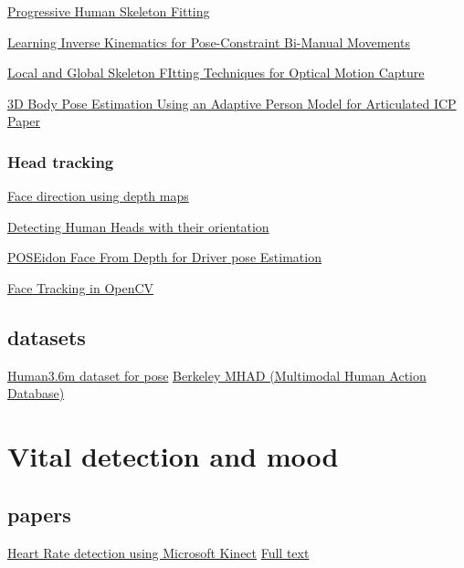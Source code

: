 \href{http://vision.gel.ulaval.ca/~vignolaj/vignolaVI03.pdf}{Progressive Human Skeleton Fitting}

\href{https://link.springer.com/content/pdf/10.1007/978-3-642-15193-4_45.pdf}{Learning Inverse Kinematics for Pose-Constraint Bi-Manual Movements}

\href{https://pdfs.semanticscholar.org/8492/075b6d9ed4a3065849d0b0eb7a705a5112b9.pdf}{Local and Global Skeleton FItting Techniques for Optical Motion Capture}

\href{https://link.springer.com/chapter/10.1007\%2F978-3-642-25489-5_16}{3D Body Pose Estimation Using an Adaptive Person Model for Articulated ICP}
\href{https://link.springer.com/content/pdf/10.1007\%2F978-3-642-25489-5_16.pdf}{Paper}

\subsubsection{Head tracking}
\href{https://arxiv.org/pdf/1309.3418.pdf}{Face direction using depth maps}

\href{http://www.dgcv.nii.ac.jp/Publications/Papers/2005/elcviaVol5No3-05.pdf}{Detecting Human Heads with their orientation}

\href{https://arxiv.org/abs/1611.10195}{POSEidon Face From Depth for Driver pose Estimation}

\href{https://www.youtube.com/watch?v=JO8XHzc6JPQ}{Face Tracking in OpenCV}

\subsection{datasets}
\href{http://vision.imar.ro/human3.6m/description.php}{Human3.6m dataset for pose}
\href{http://tele-immersion.citris-uc.org/berkeley_mhad}{Berkeley MHAD (Multimodal Human Action Database)}



\section{Vital detection and mood}
\subsection{papers}

\href{https://www.ncbi.nlm.nih.gov/pmc/articles/PMC5579477/table/sensors-17-01776-t002/}{Heart Rate detection using Microsoft Kinect}
\href{https://www.ncbi.nlm.nih.gov/pmc/articles/PMC5579477/}{Full text}

